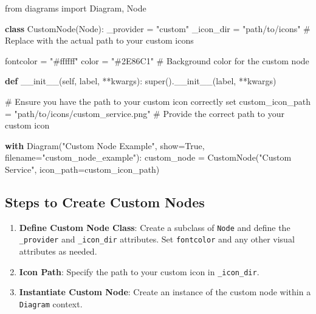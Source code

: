 \documentclass[
  letterpaper,
  DIV=11,
  numbers=noendperiod]{scrreprt}
\newenvironment{Shaded}{\begin{snugshade}}{\end{snugshade}}
\newcommand{\BuiltInTok}[1]{\textcolor[rgb]{0.00,0.23,0.31}{#1}}
\newcommand{\CommentTok}[1]{\textcolor[rgb]{0.37,0.37,0.37}{#1}}
\newcommand{\ControlFlowTok}[1]{\textcolor[rgb]{0.00,0.23,0.31}{\textbf{#1}}}
\newcommand{\FunctionTok}[1]{\textcolor[rgb]{0.28,0.35,0.67}{#1}}
\newcommand{\ImportTok}[1]{\textcolor[rgb]{0.00,0.46,0.62}{#1}}
\newcommand{\KeywordTok}[1]{\textcolor[rgb]{0.00,0.23,0.31}{\textbf{#1}}}
\newcommand{\NormalTok}[1]{\textcolor[rgb]{0.00,0.23,0.31}{#1}}
\newcommand{\OperatorTok}[1]{\textcolor[rgb]{0.37,0.37,0.37}{#1}}
\newcommand{\StringTok}[1]{\textcolor[rgb]{0.13,0.47,0.30}{#1}}
\newcommand{\VariableTok}[1]{\textcolor[rgb]{0.07,0.07,0.07}{#1}}
\begin{document}
\begin{Shaded}
\begin{Highlighting}[]
\ImportTok{from}\NormalTok{ diagrams }\ImportTok{import}\NormalTok{ Diagram, Node}

\KeywordTok{class}\NormalTok{ CustomNode(Node):}
\NormalTok{    \_provider }\OperatorTok{=} \StringTok{"custom"}
\NormalTok{    \_icon\_dir }\OperatorTok{=} \StringTok{"path/to/icons"}  \CommentTok{\# Replace with the actual path to your custom icons}
    
\NormalTok{    fontcolor }\OperatorTok{=} \StringTok{"\#ffffff"}
\NormalTok{    color }\OperatorTok{=} \StringTok{"\#2E86C1"}  \CommentTok{\# Background color for the custom node}

    \KeywordTok{def} \FunctionTok{\_\_init\_\_}\NormalTok{(}\VariableTok{self}\NormalTok{, label, }\OperatorTok{**}\NormalTok{kwargs):}
        \BuiltInTok{super}\NormalTok{().}\FunctionTok{\_\_init\_\_}\NormalTok{(label, }\OperatorTok{**}\NormalTok{kwargs)}

\CommentTok{\# Ensure you have the path to your custom icon correctly set}
\NormalTok{custom\_icon\_path }\OperatorTok{=} \StringTok{"path/to/icons/custom\_service.png"}  \CommentTok{\# Provide the correct path to your custom icon}

\ControlFlowTok{with}\NormalTok{ Diagram(}\StringTok{"Custom Node Example"}\NormalTok{, show}\OperatorTok{=}\VariableTok{True}\NormalTok{, filename}\OperatorTok{=}\StringTok{"custom\_node\_example"}\NormalTok{):}
\NormalTok{    custom\_node }\OperatorTok{=}\NormalTok{ CustomNode(}\StringTok{"Custom Service"}\NormalTok{, icon\_path}\OperatorTok{=}\NormalTok{custom\_icon\_path)}
\end{Highlighting}
\end{Shaded}

\subsection{Steps to Create Custom
Nodes}\label{steps-to-create-custom-nodes}

\begin{enumerate}
\def\labelenumi{\arabic{enumi}.}
\item
  \textbf{Define Custom Node Class}: Create a subclass of \texttt{Node}
  and define the \texttt{\_provider} and \texttt{\_icon\_dir}
  attributes. Set \texttt{fontcolor} and any other visual attributes as
  needed.
\item
  \textbf{Icon Path}: Specify the path to your custom icon in
  \texttt{\_icon\_dir}.
\item
  \textbf{Instantiate Custom Node}: Create an instance of the custom
  node within a \texttt{Diagram} context.
\end{enumerate}
\end{document}

